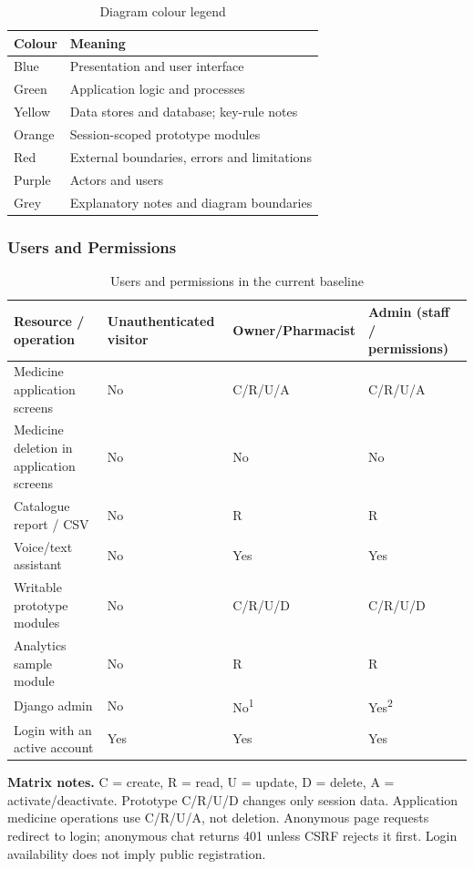 \begin{table}[H]\centering\small
\caption{Diagram colour legend}\label{tab:legend}
\begin{tabularx}{\textwidth}{@{}YY@{}}
\toprule Colour & Meaning\\\midrule
{}Blue & Presentation and user interface\\
Green & Application logic and processes\\
Yellow & Data stores and database; key-rule notes\\
Orange & Session-scoped prototype modules\\
Red & External boundaries, errors and limitations\\
Purple & Actors and users\\
Grey & Explanatory notes and diagram boundaries\\
\bottomrule\end{tabularx}
\end{table}
\subsubsection{Users and Permissions}
\begin{table}[H]\centering\small
\caption{Users and permissions in the current baseline}\label{tab:permissions}
\begin{tabularx}{\textwidth}{@{}L{56mm}YYY@{}}
\toprule Resource / operation & Unauthenticated visitor & Owner/Pharmacist & Admin (staff / permissions)\\\midrule
Medicine application screens & No & C/R/U/A & C/R/U/A\\
Medicine deletion in application screens & No & No & No\\
Catalogue report / CSV & No & R & R\\
Voice/text assistant & No & Yes & Yes\\
Writable prototype modules & No & C/R/U/D & C/R/U/D\\
Analytics sample module & No & R & R\\
Django admin & No & No\textsuperscript{1} & Yes\textsuperscript{2}\\
Login with an active account & Yes & Yes & Yes\\
\bottomrule\end{tabularx}
\end{table}
\textbf{Matrix notes.} C = create, R = read, U = update, D = delete, A = activate/deactivate. Prototype C/R/U/D changes only session data. Application medicine operations use C/R/U/A, not deletion. Anonymous page requests redirect to login; anonymous chat returns 401 unless CSRF rejects it first. Login availability does not imply public registration.


